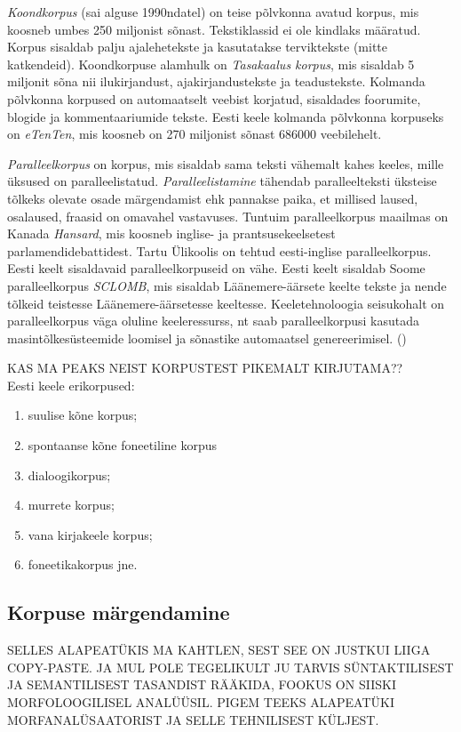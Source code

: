 \documentclass[12pt]{article}
\begin{document}
\emph{Koondkorpus} (sai alguse 1990ndatel) on teise põlvkonna avatud korpus, mis koosneb umbes 250 miljonist sõnast. Tekstiklassid ei ole kindlaks määratud. Korpus sisaldab palju ajalehetekste ja kasutatakse terviktekste (mitte katkendeid). Koondkorpuse alamhulk on \emph{Tasakaalus korpus}, mis sisaldab 5 miljonit sõna nii ilukirjandust, ajakirjandustekste ja teadustekste. Kolmanda põlvkonna korpused on automaatselt veebist korjatud, sisaldades foorumite, blogide ja kommentaariumide tekste. \citep[38]{M_OK2015} Eesti keele kolmanda põlvkonna korpuseks on \emph{eTenTen}, mis koosneb on 270 miljonist sõnast 686000 veebilehelt. \citep{eTenTen}

\emph{Paralleelkorpus} on korpus, mis sisaldab sama teksti vähemalt
kahes keeles, mille üksused on paralleelistatud. \emph{Paralleelistamine} tähendab paralleelteksti üksteise tõlkeks olevate osade märgendamist ehk pannakse paika, et millised laused, osalaused, fraasid on omavahel vastavuses. Tuntuim paralleelkorpus maailmas on Kanada \emph{Hansard}, mis koosneb inglise- ja prantsusekeelsetest parlamendidebattidest. Tartu Ülikoolis on tehtud eesti-inglise paralleelkorpus. Eesti keelt sisaldavaid paralleelkorpuseid on vähe. Eesti keelt sisaldab Soome paralleelkorpus \emph{SCLOMB}, mis sisaldab Läänemere-äärsete keelte tekste ja nende tõlkeid teistesse Läänemere-äärsetesse keeltesse. Keeletehnoloogia seisukohalt on paralleelkorpus väga oluline keeleressurss, nt saab paralleelkorpusi kasutada masintõlkesüsteemide loomisel ja sõnastike automaatsel genereerimisel.
(\citealp[17--18]{KR})


KAS MA PEAKS NEIST KORPUSTEST PIKEMALT KIRJUTAMA??\\
Eesti keele erikorpused:
\begin{enumerate}
    \item suulise kõne korpus;
    \item spontaanse kõne foneetiline korpus
    \item dialoogikorpus;
    \item murrete korpus;
    \item vana kirjakeele korpus;
    \item foneetikakorpus jne.\citep{Keelekogu}
\end{enumerate}


\subsection{Korpuse märgendamine}

SELLES ALAPEATÜKIS MA KAHTLEN, SEST SEE ON JUSTKUI LIIGA COPY-PASTE. JA MUL POLE TEGELIKULT JU TARVIS SÜNTAKTILISEST JA SEMANTILISEST TASANDIST RÄÄKIDA, FOOKUS ON SIISKI MORFOLOOGILISEL ANALÜÜSIL. PIGEM TEEKS ALAPEATÜKI MORFANALÜSAATORIST JA SELLE TEHNILISEST KÜLJEST.
\end{document}
